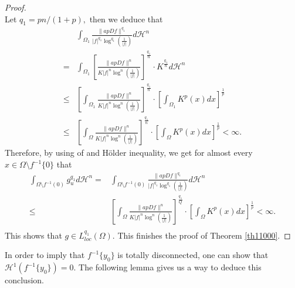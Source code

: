 \documentclass[11pt,twoside]{article}
\theoremstyle{definition}
\theoremstyle{remark}
\begin{document}
\begin{proof}
\begin{equation}
\end{equation}
Let $q_{1}=pn/(1+p),$  then we deduce that 
\begin{equation}\label{04sfbsf}
\begin{aligned}
&\int_{\Omega_{1}}\frac{\| ap Df\|^{q_{1}}}{\vert f\vert^{q_{1}}\log^{q_{1}}(\frac{1}{\vert f\vert})}d\mathcal{H}^{n}\\
=&\int_{\Omega_{1}}\left[\frac{\|ap Df\|^{n}}{K\vert f\vert^{n}\log^{n}(\frac{1}{\vert f\vert})}\right]^{\frac{q_{1}}{n}}\cdot K^{\frac{q_{1}}{n}}d\mathcal{H}^{n}\\
\leq& \left[\int_{\Omega_{1}}\frac{\| ap Df\|^{n}}{K\vert f\vert^{n}\log^{n}(\frac{1}{\vert f\vert})}\right]^{\frac{q_{1}}{n}}\cdot \left[\int_{\Omega_{1}}K^{p}(x)dx\right]^{\frac{1}{p}}\\
\leq& \left[\int_{\Omega}\frac{\| ap Df\|^{n}}{K\vert f\vert^{n}\log^{n}(\frac{1}{\vert f\vert})}\right]^{\frac{q_{1}}{n}}\cdot \left[\int_{\Omega}K^{p}(x)dx\right]^{\frac{1}{p}}<\infty.
\end{aligned}
\end{equation}
Therefore, by using of \cite[Proposition 2.17]{BB11} and H\"{o}lder inequality, we get for almost every $x\in\Omega\setminus f^{-1}\{0\}$  that 
\begin{equation}
\begin{aligned}
\int_{\Omega\setminus f^{-1}(0)}g_{u}^{q_{1}} d\mathcal{H}^{n}=&\int_{\Omega\setminus f^{-1}(0)}\frac{\| apDf\|^{q_{1}}}{\vert f\vert^{q_{1}}\log^{q_{1}}(\frac{1}{\vert f\vert})}d\mathcal{H}^{n}\\
\leq& \left[\int_{\Omega}\frac{\| apDf\|^{n}}{K\vert f\vert^{n}\log^{n}(\frac{1}{\vert f\vert})}\right]^{\frac{q_{1}}{Q}}\cdot \left[\int_{\Omega}K^{p}(x)dx\right]^{\frac{1}{p}}<\infty.\\
\end{aligned}
\end{equation}
This shows that $g\in L_{loc}^{q_{1}}(\Omega).$  This finishes the proof of Theorem \ref{th11000}.
\end{proof}

In order to imply that $f^{-1}\{y_{0}\}$ is totally disconnected, one can show that $\mathcal{H}^{1}(f^{-1}\{y_{0}\})=0.$ The following lemma gives us a way to deduce this conclusion. 
\end{document}
